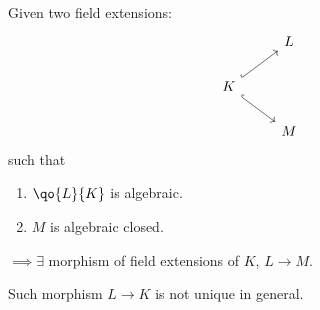 \begin{proposition}
	\label{prop:extension-alg}
	Given two field extensions:
	\[
		\begin{tikzcd}
			& L \\
			K \arrow[ur, hook] \arrow[dr, hook] & \\
			& M
		\end{tikzcd}
	\]
	such that
	\begin{enumerate}
		\item \( \qo{L}{K} \) is algebraic.
		\item \( M \) is algebraic closed.
	\end{enumerate}
	\( \implies \exists \) morphism of field extensions of \( K \), \( L \to M \).
	\begin{note}
		Such morphism \( L \to K \) is not unique in general.
	\end{note}
\end{proposition}

